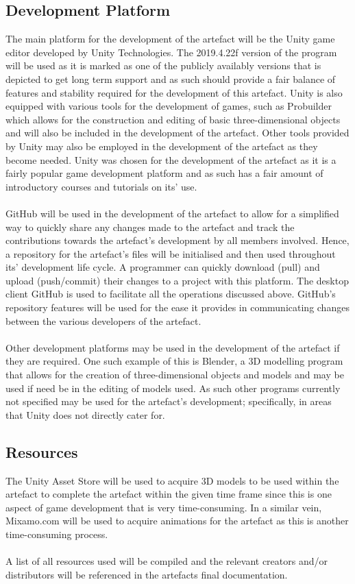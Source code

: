 \subsection{Development Platform}
The main platform for the development of the artefact will be the Unity game editor developed by Unity Technologies. The 2019.4.22f version of the program will be used as it is marked as one of the publicly availably versions that is depicted to get long term support and as such should provide a fair balance of features and stability required for the development of this artefact. Unity is also equipped with various tools for the development of games, such as Probuilder which allows for the construction and editing of basic three-dimensional objects and will also be included in the development of the artefact. Other tools provided by Unity may also be employed in the development of the artefact as they become needed. Unity was chosen for the development of the artefact as it is a fairly popular game development platform and as such has a fair amount of introductory courses and tutorials on its’ use. 
\\\\
GitHub will be used in the development of the artefact to allow for a simplified way to quickly share any changes made to the artefact and track the contributions towards the artefact's development by all members involved. Hence, a repository for the artefact's files will be initialised and then used throughout its’ development life cycle. A programmer can quickly download (pull) and upload (push/commit) their changes to a project with this platform. The desktop client GitHub is used to facilitate all the operations discussed above. GitHub’s repository features will be used for the ease it provides in communicating changes between the various developers of the artefact. 
\\\\
Other development platforms may be used in the development of the artefact if they are required. One such example of this is Blender, a 3D modelling program that allows for the creation of three-dimensional objects and models and may be used if need be in the editing of models used. As such other programs currently not specified may be used for the artefact's development; specifically, in areas that Unity does not directly cater for.

\subsection{Resources}
The Unity Asset Store will be used to acquire 3D models to be used within the artefact to complete the artefact within the given time frame since this is one aspect of game development that is very time-consuming. In a similar vein, Mixamo.com will be used to acquire animations for the artefact as this is another time-consuming process.
\\\\
A list of all resources used will be compiled and the relevant creators and/or distributors will be referenced in the artefacts final documentation.  

